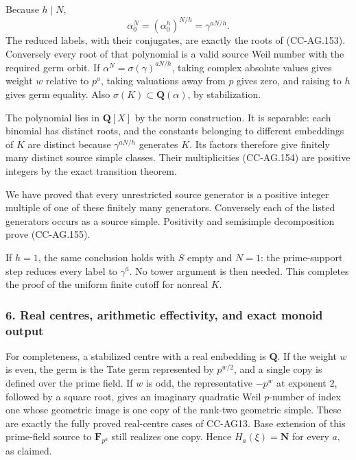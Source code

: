 Because \(h\mid N\), \[
       \alpha_0^N=(\alpha_0^h)^{N/h}=\gamma^{aN/h}.
 \tag{CC-AG.168}
\] The reduced labels, with their conjugates, are exactly the roots of
(CC-AG.153). Conversely every root of that polynomial is a valid source
Weil number with the required germ orbit. If
\(\alpha^N=\sigma(\gamma)^{aN/h}\), taking complex absolute values gives
weight \(w\) relative to \(p^a\), taking valuations away from \(p\)
gives zero, and raising to \(h\) gives germ equality. Also
\(\sigma(K)\subset\mathbf Q(\alpha)\), by stabilization.

The polynomial lies in \(\mathbf Q[X]\) by the norm construction. It is
separable: each binomial has distinct roots, and the constants belonging
to different embeddings of \(K\) are distinct because \(\gamma^{aN/h}\)
generates \(K\). Its factors therefore give finitely many distinct
source simple classes. Their multiplicities (CC-AG.154) are positive
integers by the exact transition theorem.

We have proved that every unrestricted source generator is a positive
integer multiple of one of these finitely many generators. Conversely
each of the listed generators occurs as a source simple. Positivity and
semisimple decomposition prove (CC-AG.155).

If \(h=1\), the same conclusion holds with \(S\) empty and \(N=1\): the
prime-support step reduces every label to \(\gamma^a\). No tower
argument is then needed. This completes the proof of the uniform finite
cutoff for nonreal \(K\).

\subsubsection{6. Real centres, arithmetic effectivity, and exact monoid
output}\label{real-centres-arithmetic-effectivity-and-exact-monoid-output}

For completeness, a stabilized centre with a real embedding is
\(\mathbf Q\). If the weight \(w\) is even, the germ is the Tate germ
represented by \(p^{w/2}\), and a single copy is defined over the prime
field. If \(w\) is odd, the representative \(-p^w\) at exponent \(2\),
followed by a square root, gives an imaginary quadratic Weil
\(p\)-number of index one whose geometric image is one copy of the
rank-two geometric simple. These are exactly the fully proved
real-centre cases of CC-AG13. Base extension of this prime-field source
to \(\mathbf F_{p^a}\) still realizes one copy. Hence
\(H_a(\xi)=\mathbf N\) for every \(a\), as claimed.

